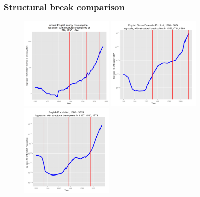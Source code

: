 \documentclass[final]{beamer}
\begin{document}
\begin{frame}
		\frametitle{Structural break comparison}
\begin{figure}[p!]
		\label{fig:structural}		
		\centerline{
		\mbox{\includegraphics[width=0.39\textwidth]{energyLog1}}
		\mbox{\includegraphics[width=0.39\textwidth]{gbpgdplog}}
		\mbox{\includegraphics[width=0.39\textwidth]{popLog}}
		}
\end{figure}
\end{frame}
\end{document}

